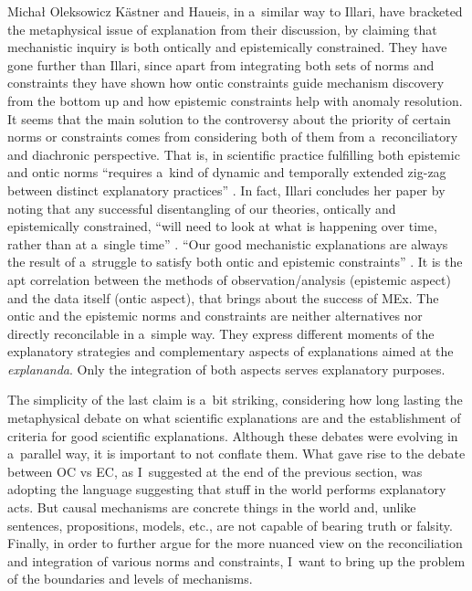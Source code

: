 \begin{artengenv}{Michał Oleksowicz}
Kästner and Haueis, in a~similar way to Illari, have bracketed the metaphysical issue of explanation from their discussion, by claiming that mechanistic inquiry is both ontically and epistemically constrained. They have gone further than Illari, since apart from integrating both sets of norms and constraints they have shown how ontic constraints guide mechanism discovery from the bottom up and how epistemic constraints help with anomaly resolution. It seems that the main solution to the controversy about the priority of certain norms or constraints comes from considering both of them from a~reconciliatory and diachronic perspective. That is, in scientific practice fulfilling both epistemic and ontic norms ``requires a~kind of dynamic and temporally extended zig-zag between distinct explanatory practices''
\parencite[][p.943]{sheredos_re-reconciling_2016}. %
 In fact, Illari concludes her paper by noting that any successful disentangling of our theories, ontically and epistemically constrained, ``will need to look at what is happening over time, rather than at a~single time'' 
\parencite[][p.254]{illari_mechanistic_2013}. %
 ``Our good mechanistic explanations are always the result of a~struggle to satisfy both ontic and epistemic constraints'' 
\parencite[][p.254]{illari_mechanistic_2013}. %
 It is the apt correlation between the methods of observation/analysis (epistemic aspect) and the data itself (ontic aspect), that brings about the success of MEx. The ontic and the epistemic norms and constraints are neither alternatives nor directly reconcilable in a~simple way. They express different moments of the explanatory strategies and complementary aspects of explanations aimed at the \textit{explananda}. Only the integration of both aspects serves explanatory purposes.

The simplicity of the last claim is a~bit striking, considering how long lasting the metaphysical debate on what scientific explanations are and the establishment of criteria for good scientific explanations. Although these debates were evolving in a~parallel way, it is important to not conflate them. What gave rise to the debate between OC vs EC, as I~suggested at the end of the previous section, was adopting the language suggesting that stuff in the world performs explanatory acts. But causal mechanisms are concrete things in the world and, unlike sentences, propositions, models, etc., are not capable of bearing truth or falsity. Finally, in order to further argue for the more nuanced view on the reconciliation and integration of various norms and constraints, I~want to bring up the problem of the boundaries and levels of mechanisms.


\end{artengenv}
